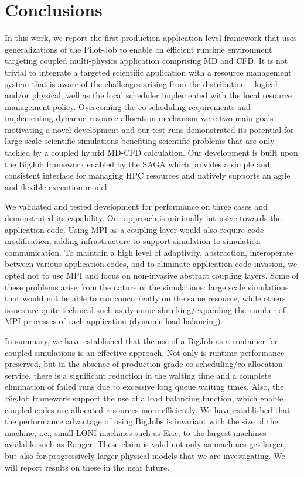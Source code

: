 \documentclass[conference,final]{IEEEtran}
\begin{document}
\section{Conclusions}


In this work, we report the first production application-level
framework that uses generalizations of the Pilot-Job to enable an
efficient runtime environment targeting coupled multi-physics
application comprising MD and CFD.  It is not trivial to integrate a
targeted scientific application with a resource management system that
is aware of the challenges arising from the distribution -- logical
and/or physical, well as the local scheduler implemented with the
local resource management policy.  Overcoming the co-scheduling
requirements and implementing dynamic resource allocation mechanism
were two main goals motivating a novel development and our test runs
demonstrated its potential for large scale scientific simulations
benefiting scientific problems that are only tackled by a coupled
hybrid MD-CFD calculation.  Our development is built upon the BigJob
framework enabled by the SAGA which provides a simple and consistent
interface for managing HPC resources and natively supports an agile
and flexible execution model.

We validated and tested development for performance on three cases and
demonstrated its capability.  Our approach is minimally intrusive
towards the application code.  Using MPI as a coupling layer would
also require code modification, adding infrastructure to support
simulation-to-simulation communication. To maintain a high level of
adaptivity, abstraction, interoperate between various application
codes, and to eliminate application code invasion, we opted not to use
MPI and focus on non-invasive abstract coupling layers.  Some of these
problems arise from the nature of the simulations: large scale
simulations that would not be able to run concurrently on the same
resource, while others issues are quite technical such as dynamic
shrinking/expanding the number of MPI processes of each application
(dynamic load-balancing).
 
In summary, we have established that the use of a BigJob as a
container for coupled-simulations is an effective approach. Not only
is runtime performance preserved, but in the absence of production
grade co-scheduling/co-allocation service, there is a significant
reduction in the waiting time and a complete elimination of failed
runs due to excessive long queue waiting times.  Also, the BigJob
framework support the use of a load balancing function, which enable
coupled codes use allocated resources more efficiently. We have
established that the performance advantage of using BigJobs is
invariant with the size of the machine, i.e., small LONI machines such
as Eric, to the largest machines available such as Ranger. These claim
is valid not only as machines get larger, but also for progressively
larger physical models that we are investigating. We will report
results on these in the near future.
\end{document}
